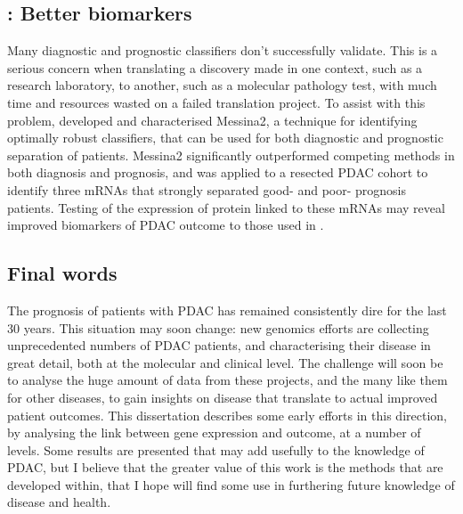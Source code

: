 \documentclass[thesis.tex]{subfiles}
\begin{document}
\subsection{\texorpdfstring{}{Chapter 4}: Better biomarkers}
Many diagnostic and prognostic classifiers don't successfully validate.  This is a serious concern when translating a discovery made in one context, such as a research laboratory, to another, such as a molecular pathology test, with much time and resources wasted on a failed translation project.  To assist with this problem,  developed and characterised Messina2, a technique for identifying optimally robust classifiers, that can be used for both diagnostic and prognostic separation of patients.  Messina2 significantly outperformed competing methods in both diagnosis and prognosis, and was applied to a resected \gls{PDAC} cohort to identify three mRNAs that strongly separated good- and poor- prognosis patients.  Testing of the expression of protein linked to these mRNAs may reveal improved biomarkers of \gls{PDAC} outcome to those used in .

\subsection{Final words}
The prognosis of patients with \gls{PDAC} has remained consistently dire for the last 30 years.  This situation may soon change: new genomics efforts are collecting unprecedented numbers of \gls{PDAC} patients, and characterising their disease in great detail, both at the molecular and clinical level.  The challenge will soon be to analyse the huge amount of data from these projects, and the many like them for other diseases, to gain insights on disease that translate to actual improved patient outcomes.  This dissertation describes some early efforts in this direction, by analysing the link between gene expression and outcome, at a number of levels.  Some results are presented that may add usefully to the knowledge of \gls{PDAC}, but I believe that the greater value of this work is the methods that are developed within, that I hope will find some use in furthering future knowledge of disease and health.
\end{document}
